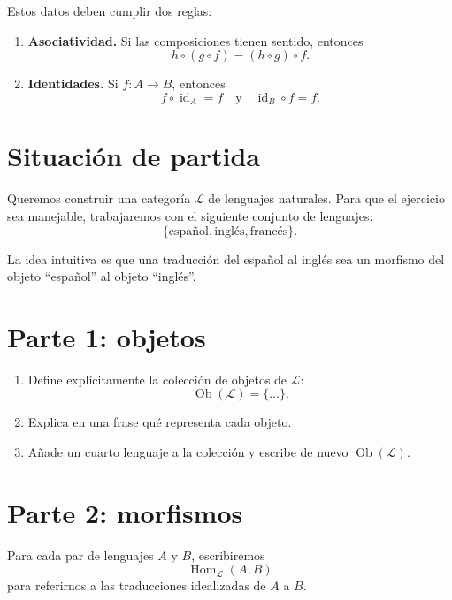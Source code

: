 \documentclass[11pt,a4paper]{article}
\newcommand{\Cat}{\mathcal{L}}
\newcommand{\Ob}{\operatorname{Ob}}
\newcommand{\Hom}{\operatorname{Hom}}
\newcommand{\id}{\operatorname{id}}
\begin{document}
Estos datos deben cumplir dos reglas:

\begin{enumerate}
  \item \textbf{Asociatividad.} Si las composiciones tienen sentido, entonces
  \[
    h\circ (g\circ f)=(h\circ g)\circ f.
  \]

  \item \textbf{Identidades.} Si \(f:A\to B\), entonces
  \[
    f\circ \id_A=f
    \quad\text{y}\quad
    \id_B\circ f=f.
  \]
\end{enumerate}

\section*{Situación de partida}

Queremos construir una categoría \(\Cat\) de lenguajes naturales. Para que el
ejercicio sea manejable, trabajaremos con el siguiente conjunto de lenguajes:
\[
  \{\text{español},\text{inglés},\text{francés}\}.
\]

La idea intuitiva es que una traducción del español al inglés sea un morfismo
del objeto ``español'' al objeto ``inglés''.

\section*{Parte 1: objetos}

\begin{enumerate}
  \item Define explícitamente la colección de objetos de \(\Cat\):
  \[
    \Ob(\Cat)=\{\ldots\}.
  \]

  \item Explica en una frase qué representa cada objeto.

  \item Añade un cuarto lenguaje a la colección y escribe de nuevo
  \(\Ob(\Cat)\).
\end{enumerate}

\section*{Parte 2: morfismos}

Para cada par de lenguajes \(A\) y \(B\), escribiremos
\[
  \Hom_{\Cat}(A,B)
\]
para referirnos a las traducciones idealizadas de \(A\) a \(B\).
\end{document}
